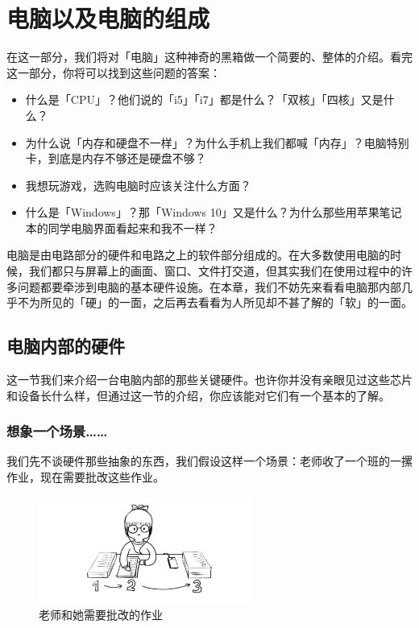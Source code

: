 \chapter{电脑以及电脑的组成}
\label{computer-and-its-components}

\begin{intro}
  在这一部分，我们将对「电脑」这种神奇的黑箱做一个简要的、整体的介绍。看完这一部分，你将可以找到这些问题的答案：

  \begin{itemize}
    \item 什么是「CPU」？他们说的「i5」「i7」都是什么？「双核」「四核」又是什么？
    \item 为什么说「内存和硬盘不一样」？为什么手机上我们都喊「内存」？电脑特别卡，到底是内存不够还是硬盘不够？
    \item 我想玩游戏，选购电脑时应该关注什么方面？
    \item 什么是「Windows」？那「Windows 10」又是什么？为什么那些用苹果笔记本的同学电脑界面看起来和我不一样？
  \end{itemize}
\end{intro}

电脑是由电路部分的硬件和电路之上的软件部分组成的。在大多数使用电脑的时候，我们都只与屏幕上的画面、窗口、文件打交道，但其实我们在使用过程中的许多问题都要牵涉到电脑的基本硬件设施。在本章，我们不妨先来看看电脑那内部几乎不为所见的「硬」的一面，之后再去看看为人所见却不甚了解的「软」的一面。

\section{电脑内部的硬件} 

这一节我们来介绍一台电脑内部的那些关键硬件。也许你并没有亲眼见过这些芯片和设备长什么样，但通过这一节的介绍，你应该能对它们有一个基本的了解。

\subsection{想象一个场景……}

我们先不谈硬件那些抽象的东西，我们假设这样一个场景：老师收了一个班的一摞作业，现在需要批改这些作业。

\begin{figure}[H]
  \centering
  \includegraphics[width=7cm]{assets/Teacher_and_homework.png}
  \caption{老师和她需要批改的作业}
  \label{teacher-and-homework}
\end{figure}

